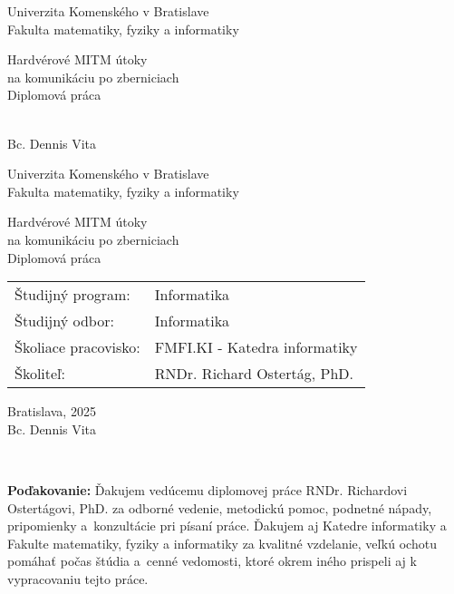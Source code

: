 \documentclass[12pt, twoside]{book}
\def\mfrok{2025}
\def\mfnazov{Hardvérové MITM útoky\\na komunikáciu po zberniciach}
\def\mftyp{Diplomová práca}
\def\mfautor{Bc. Dennis Vita}
\def\mfskolitel{RNDr. Richard Ostertág, PhD. }
\def\mfmiesto{Bratislava, \mfrok}
\def\mfodbor{ Informatika}
\def\program{ Informatika }
\def\mfpracovisko{ FMFI.KI - Katedra informatiky }
\begin{document}
\frontmatter
\pagestyle{empty}

\begin{center}
\sc\large
Univerzita Komenského v Bratislave\\
Fakulta matematiky, fyziky a informatiky

\vfill

{\LARGE\mfnazov}\\
\mftyp
\end{center}

\vfill

{\sc\large 
\noindent \mfrok\\
\mfautor
}

\cleardoublepage


\noindent
\setcounter{page}{1}

\begin{center}
\sc  
\large
Univerzita Komenského v Bratislave\\
Fakulta matematiky, fyziky a informatiky

\vfill

{\LARGE\mfnazov}\\
\mftyp
\end{center}

\vfill

\noindent
\begin{tabular}{ll}
Študijný program: & \program \\
Študijný odbor: & \mfodbor \\
Školiace pracovisko: & \mfpracovisko \\
Školiteľ: & \mfskolitel \\
\end{tabular}

\vfill


\noindent \mfmiesto\\
\mfautor

\cleardoublepage


\newpage 


\cleardoublepage


\newpage
\pagestyle{plain}
~

\vfill
{\bf Poďakovanie:} Ďakujem vedúcemu diplomovej práce RNDr. Richardovi Ostertágovi, PhD. za odborné vedenie, metodickú pomoc, podnetné nápady, pripomienky a~konzultácie pri písaní práce. Ďakujem aj Katedre informatiky a Fakulte matematiky, fyziky a informatiky za kvalitné vzdelanie, veľkú ochotu pomáhať počas štúdia a~cenné vedomosti, ktoré okrem iného prispeli aj k vypracovaniu tejto práce.
\end{document}
